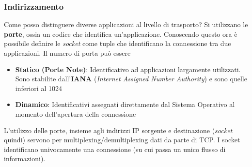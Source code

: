\documentclass{article}
\begin{document}
            \subsubsection{Indirizzamento}
                Come posso distinguere diverse applicazioni al livello di trasporto? Si utilizzano le \textbf{porte}, ossia un codice che identifica un'applicazione. Conoscendo questo ora è possibile definire le \textit{socket} come tuple che identificano la connessione tra due applicazioni.
                Il numero di porta può essere
                \begin{itemize}
                    \item \textbf{Statico (Porte Note)}: Identificativo ad applicazioni largamente utilizzati. Sono stabilite dall'\textbf{IANA} (\textit{Internet Assigned
                    Number Authority}) e sono quelle inferiori al 1024
                    \item \textbf{Dinamico}: Identificativi assegnati direttamente dal Sistema Operativo al momento dell'apertura della connessione  
                \end{itemize}
                L'utilizzo delle porte, insieme agli indirizzi IP sorgente e destinazione (\textit{socket} quindi) servono per multiplexing/demultiplexing dati da parte di TCP. I socket identificano univocamente una connessione (su cui passa un unico flusso di informazioni).
\end{document}
